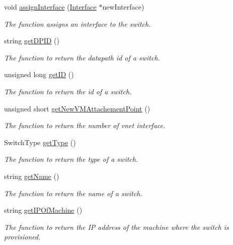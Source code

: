 \begin{DoxyCompactItemize}
\item 
void \hyperlink{classSwitch_a087f1aa58ee5489365e4236ec90a5439}{assign\-Interface} (\hyperlink{classInterface}{\-Interface} $\ast$new\-Interface)
\begin{DoxyCompactList}\small\item\em \-The function assigns an interface to the switch. \end{DoxyCompactList}\item 
string \hyperlink{classSwitch_a3cc7f9ef96f673293ab4ea4069caf27f}{get\-D\-P\-I\-D} ()
\begin{DoxyCompactList}\small\item\em \-The function to return the datapath id of a switch. \end{DoxyCompactList}\item 
unsigned long \hyperlink{classSwitch_a18e13da7323d92c01d383f56aeb7dc91}{get\-I\-D} ()
\begin{DoxyCompactList}\small\item\em \-The function to return the id of a switch. \end{DoxyCompactList}\item 
unsigned short \hyperlink{classSwitch_afde2d9f4d9e2510c45aec336a8a712ed}{get\-New\-V\-M\-Attachement\-Point} ()
\begin{DoxyCompactList}\small\item\em \-The function to return the number of vnet interface. \end{DoxyCompactList}\item 
\-Switch\-Type \hyperlink{classSwitch_aefcd830a9fcadb2458924ff3eb4a1ec0}{get\-Type} ()
\begin{DoxyCompactList}\small\item\em \-The function to return the type of a switch. \end{DoxyCompactList}\item 
string \hyperlink{classSwitch_a8b325a8f123eb07bdd2e7381af3a83f6}{get\-Name} ()
\begin{DoxyCompactList}\small\item\em \-The function to return the name of a switch. \end{DoxyCompactList}\item 
string \hyperlink{classSwitch_a52161638a0f5429ac83d78cbc85c82db}{get\-I\-P\-Of\-Machine} ()
\begin{DoxyCompactList}\small\item\em \-The function to return the \-I\-P address of the machine where the switch is provisioned. \end{DoxyCompactList}\item 

\end{DoxyCompactItemize}
